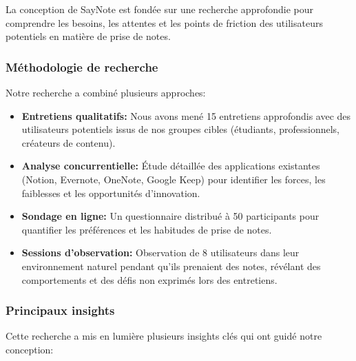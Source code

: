     La conception de SayNote est fondée sur une recherche approfondie pour comprendre les besoins, les attentes et les points de friction des utilisateurs potentiels en matière de prise de notes.
    
    \subsubsection{Méthodologie de recherche}
    
    Notre recherche a combiné plusieurs approches:
    
    \begin{itemize}
        \item \textbf{Entretiens qualitatifs:} Nous avons mené 15 entretiens approfondis avec des utilisateurs potentiels issus de nos groupes cibles (étudiants, professionnels, créateurs de contenu).
        
        \item \textbf{Analyse concurrentielle:} Étude détaillée des applications existantes (Notion, Evernote, OneNote, Google Keep) pour identifier les forces, les faiblesses et les opportunités d'innovation.
        
        \item \textbf{Sondage en ligne:} Un questionnaire distribué à 50 participants pour quantifier les préférences et les habitudes de prise de notes.
        
        \item \textbf{Sessions d'observation:} Observation de 8 utilisateurs dans leur environnement naturel pendant qu'ils prenaient des notes, révélant des comportements et des défis non exprimés lors des entretiens.
    \end{itemize}
    
    \subsubsection{Principaux insights}
    
    Cette recherche a mis en lumière plusieurs insights clés qui ont guidé notre conception:
    
